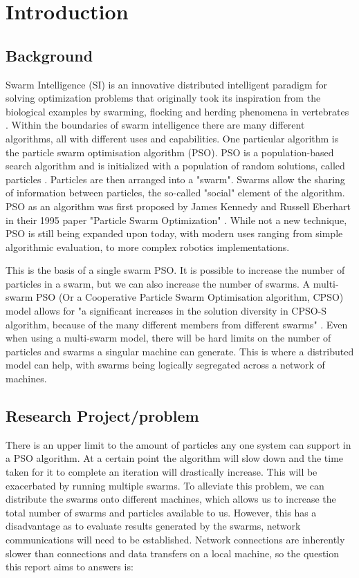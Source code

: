 \documentclass[oneside,12pt]{book}
\begin{document}

\chapter{Introduction}
\section{Background}
\par Swarm Intelligence (SI) is an innovative distributed intelligent paradigm for solving optimization problems that originally took its inspiration from the biological examples by swarming, flocking and herding phenomena in vertebrates \cite{abraham_guo_liu_2006}.
Within the boundaries of swarm intelligence there are many different algorithms, all with different uses and capabilities. One particular algorithm is the particle swarm optimisation algorithm (PSO). PSO is a population-based search algorithm and is initialized with a population of random solutions, called particles \cite{shi_2004}. Particles are then arranged into a "swarm". Swarms allow the sharing of information between particles, the so-called "social" element of the algorithm. PSO as an algorithm was first proposed by James Kennedy and Russell Eberhart in their 1995 paper "Particle Swarm Optimization" \cite{kennedy_eberhart_1995}. While not a new technique, PSO is still being expanded upon today, with modern uses ranging from simple algorithmic evaluation, to more complex robotics implementations. 

This is the basis of a single swarm PSO. It is possible to increase the number of particles in a swarm, but we can also increase the number of swarms. A multi-swarm PSO (Or a Cooperative Particle Swarm Optimisation algorithm, CPSO) model allows for "a significant increases in the solution diversity in CPSO-S algorithm, because of the many different members from different swarms" \cite{vandenbergh_engelbrecht_2004}. Even when using a multi-swarm model, there will be hard limits on the number of particles and swarms a singular machine can generate. This is where a distributed model can help, with swarms being logically segregated across a network of machines.

\section{Research Project/problem}
There is an upper limit to the amount of particles any one system can support in a PSO algorithm. At a certain point the algorithm will slow down and the time taken for it to complete an iteration will drastically increase. This will be exacerbated by running multiple swarms. 
To alleviate this problem, we can distribute the swarms onto different machines, which allows us to increase the total number of swarms and particles available to us. However, this has a disadvantage as to evaluate results generated by the swarms, network communications will need to be established. Network connections are inherently slower than connections and data transfers on a local machine, so the question this report aims to answers is:
\end{document}
